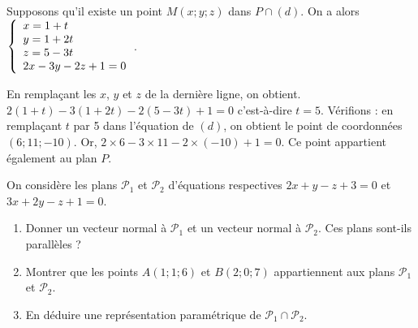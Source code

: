 \documentclass[11pt,fleqn, openany]{book} %
\begin{document}
\begin{solution}Supposons qu'il existe un point $M(x;y;z)$ dans $P \cap (d)$. On a alors $\left\{ \renewcommand{\arraystretch}{1}\renewcommand{\arraystretch}{1}\begin{array}{l}x=1+t \\ y=1+2t \\ z = 5-3t \\ 2x-3y-2z+1=0 \end{array}\right.$.

En remplaçant les $x$, $y$ et $z$ de la dernière ligne, on obtient. $2(1+t)-3(1+2t)-2(5-3t)+1=0$ c'est-à-dire $t=5$. Vérifions : en remplaçant $t$ par 5 dans l'équation de $(d)$, on obtient le point de coordonnées $(6;11;-10)$. Or, $2\times 6 -3 \times 11 -2 \times (-10)+1=0$. Ce point appartient également au plan $P$.\end{solution}




\begin{exercise}[topic=geom14]On considère les plans $\mathcal{P}_1$ et $\mathcal{P}_2$ d'équations respectives $2x+y-z+3=0$ et $3x+2y-z+1=0$.

\begin{enumerate}
\item Donner un vecteur normal à $\mathcal{P}_1$ et un vecteur normal à $\mathcal{P}_2$. Ces plans sont-ils parallèles ?
\item Montrer que les points $A(1;1;6)$ et $B(2;0;7)$ appartiennent aux plans $\mathcal{P}_1$ et $\mathcal{P}_2$.
\item En déduire une représentation paramétrique de $\mathcal{P}_1 \cap \mathcal{P}_2$.
\end{enumerate}\end{exercise}
\end{document}
